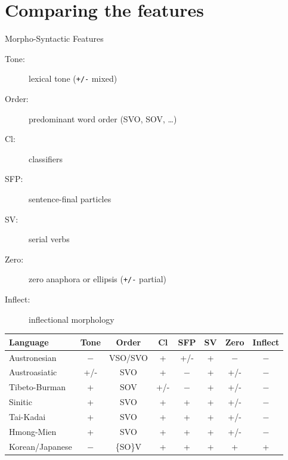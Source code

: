 \documentclass{beamer}
\begin{document}
\section{Comparing the features}


\begin{frame}[allowframebreaks]{Morpho-Syntactic Features}
\begin{description}
    \item[Tone:] lexical tone (\texttt{+/-} mixed)
    \item[Order:] predominant word order (SVO, SOV, \ldots)
    \item[Cl:] classifiers
    \item[SFP:] sentence-final particles
    \item[SV:] serial verbs
    \item[Zero:] zero anaphora or ellipsis (\texttt{+/-} partial)
    \item[Inflect:] inflectional morphology
    \end{description}

    \framebreak

\begin{center}
{\small
\begin{tabular}{lccccccc}

 \textbf{Language}        & \textbf{Tone} & \textbf{Order} & \textbf{Cl} & \textbf{SFP} & \textbf{SV} & \textbf{Zero} & \textbf{Inflect} \\ \hline
Austronesian    & $-$ & VSO/SVO & + & +/- & + & $-$ & $-$ \\ 
Austroasiatic   & +/- & SVO & + & $-$ & + & +/- & $-$ \\ 
Tibeto-Burman   & + & SOV & +/- & $-$ & + & +/- & $-$ \\ 
Sinitic         & +  & SVO & +  & + & + & +/- & $-$ \\ 
Tai-Kadai       & +  & SVO & + & + & + & +/- & $-$ \\ 
Hmong-Mien      & +  & SVO & + & + & + & +/- & $-$ \\ 
Korean/Japanese & $-$  & \{SO\}V & + & + & + & + & + \\ 

  \end{tabular}}
      \end{center}
\end{frame}
\end{document}
